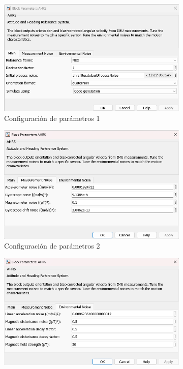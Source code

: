 \begin{figure}[htbp]
\begin{subfigure}[b]{0.45\textwidth}
        \centering
        \includegraphics[width=\textwidth]{fig/Capitulo5/Caso_de_estudio_IMU/Generador_de_salidas/configuracion_AHRS_01.png}
        \caption{Configuración de parámetros 1}
        \label{fig:parametros_AHRS_01}
    \end{subfigure}
    \hfill
    \begin{subfigure}[b]{0.45\textwidth}
        \centering
        \includegraphics[width=\textwidth]{fig/Capitulo5/Caso_de_estudio_IMU/Generador_de_salidas/configuracion_AHRS_02.png}
        \caption{Configuración de parámetros 2}
        \label{fig:parametros_AHRS_02}
    \end{subfigure}
    \hfill
    \begin{subfigure}[b]{0.45\textwidth}
        \centering
        \includegraphics[width=\textwidth]{fig/Capitulo5/Caso_de_estudio_IMU/Generador_de_salidas/configuracion_AHRS_03.png}

\end{subfigure}
\end{figure}
